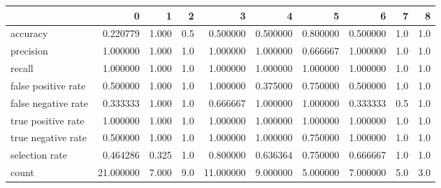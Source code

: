 \begin{tabular}{lrrrrrrrrr}
\toprule
{} &          0 &      1 &    2 &          3 &         4 &         5 &         6 &    7 &    8 \\
\midrule
accuracy            &   0.220779 &  1.000 &  0.5 &   0.500000 &  0.500000 &  0.800000 &  0.500000 &  1.0 &  1.0 \\
precision           &   1.000000 &  1.000 &  1.0 &   1.000000 &  1.000000 &  0.666667 &  1.000000 &  1.0 &  1.0 \\
recall              &   1.000000 &  1.000 &  1.0 &   1.000000 &  1.000000 &  1.000000 &  1.000000 &  1.0 &  1.0 \\
false positive rate &   0.500000 &  1.000 &  1.0 &   1.000000 &  0.375000 &  0.750000 &  0.500000 &  1.0 &  1.0 \\
false negative rate &   0.333333 &  1.000 &  1.0 &   0.666667 &  1.000000 &  1.000000 &  0.333333 &  0.5 &  1.0 \\
true positive rate  &   1.000000 &  1.000 &  1.0 &   1.000000 &  1.000000 &  1.000000 &  1.000000 &  1.0 &  1.0 \\
true negative rate  &   0.500000 &  1.000 &  1.0 &   1.000000 &  1.000000 &  0.750000 &  1.000000 &  1.0 &  1.0 \\
selection rate      &   0.464286 &  0.325 &  1.0 &   0.800000 &  0.636364 &  0.750000 &  0.666667 &  1.0 &  1.0 \\
count               &  21.000000 &  7.000 &  9.0 &  11.000000 &  9.000000 &  5.000000 &  7.000000 &  5.0 &  3.0 \\
\bottomrule
\end{tabular}
